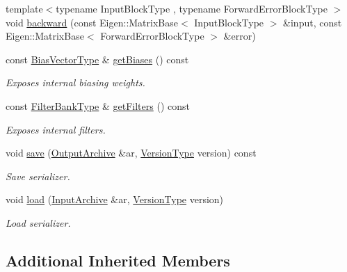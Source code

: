 \begin{DoxyCompactItemize}
\item 
{\footnotesize template$<$typename Input\-Block\-Type , typename Forward\-Error\-Block\-Type $>$ }\\void \hyperlink{classffnn_1_1layer_1_1_convolution_volume_a3fbe2727503ed4fa35dcc4ddcd289134}{backward} (const Eigen\-::\-Matrix\-Base$<$ Input\-Block\-Type $>$ \&input, const Eigen\-::\-Matrix\-Base$<$ Forward\-Error\-Block\-Type $>$ \&error)
\item 
const \hyperlink{classffnn_1_1layer_1_1_convolution_volume_a590c7ebb2448c2636252101529337928}{Bias\-Vector\-Type} \& \hyperlink{classffnn_1_1layer_1_1_convolution_volume_a75b21d1fcdca0b2df3f7af18e7163cb1}{get\-Biases} () const 
\begin{DoxyCompactList}\small\item\em Exposes internal biasing weights. \end{DoxyCompactList}\item 
const \hyperlink{classffnn_1_1layer_1_1_convolution_volume_a00ac018ac5cb79534a5b3b4fbc55637e}{Filter\-Bank\-Type} \& \hyperlink{classffnn_1_1layer_1_1_convolution_volume_a3b5eabef68b261ce0c1de9a81f9ccb5b}{get\-Filters} () const 
\begin{DoxyCompactList}\small\item\em Exposes internal filters. \end{DoxyCompactList}\item 
void \hyperlink{classffnn_1_1layer_1_1_convolution_volume_a4c2d53fd8eb6c95683945ab91220bf03}{save} (\hyperlink{classffnn_1_1traits_1_1_serializable_a08d986df75d363fa79506d4f6045cb9f}{Output\-Archive} \&ar, \hyperlink{classffnn_1_1traits_1_1_serializable_a08924b3b7d20cb3cb6eafe517d4f7b30}{Version\-Type} version) const 
\begin{DoxyCompactList}\small\item\em Save serializer. \end{DoxyCompactList}\item 
void \hyperlink{classffnn_1_1layer_1_1_convolution_volume_aefb6f463f9533b290a5df3d1fc8e02ef}{load} (\hyperlink{classffnn_1_1traits_1_1_serializable_a6e626759259f8f370dd4303b4441a234}{Input\-Archive} \&ar, \hyperlink{classffnn_1_1traits_1_1_serializable_a08924b3b7d20cb3cb6eafe517d4f7b30}{Version\-Type} version)
\begin{DoxyCompactList}\small\item\em Load serializer. \end{DoxyCompactList}\end{DoxyCompactItemize}
\subsection*{Additional Inherited Members}


